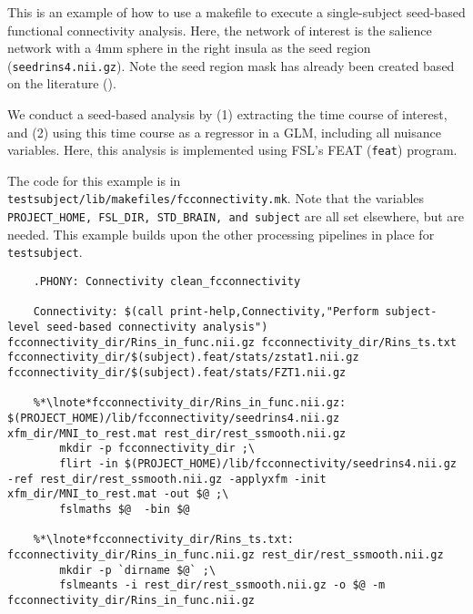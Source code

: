 \label{example:fcconnectivity}
This is an example of how to use a makefile to execute a
single-subject seed-based functional connectivity analysis. Here, the network of interest is the salience network with a 4mm sphere in the right insula as the seed region (\texttt{seedrins4.nii.gz}). Note the seed region mask has already been created based on the literature (\cite{seely2008,lee2014}).

We conduct a seed-based analysis by (1) extracting the time course of
interest, and (2) using this time course as a regressor in a GLM,
including all nuisance variables. Here, this analysis is implemented
using FSL's FEAT (\texttt{feat}) program.


The code for this example is in \texttt{testsubject/lib/makefiles/fcconnectivity.mk}.
Note that the variables \texttt{PROJECT_HOME, FSL_DIR, STD_BRAIN, and subject} are all set elsewhere, but are needed.  This example builds upon the other processing pipelines in place for \texttt{testsubject}.

\begin{lstlisting}
	.PHONY: Connectivity clean_fcconnectivity

	Connectivity: $(call print-help,Connectivity,"Perform subject-level seed-based connectivity analysis") fcconnectivity_dir/Rins_in_func.nii.gz fcconnectivity_dir/Rins_ts.txt fcconnectivity_dir/$(subject).feat/stats/zstat1.nii.gz fcconnectivity_dir/$(subject).feat/stats/FZT1.nii.gz

	%*\lnote*fcconnectivity_dir/Rins_in_func.nii.gz: $(PROJECT_HOME)/lib/fcconnectivity/seedrins4.nii.gz xfm_dir/MNI_to_rest.mat rest_dir/rest_ssmooth.nii.gz
		mkdir -p fcconnectivity_dir ;\
		flirt -in $(PROJECT_HOME)/lib/fcconnectivity/seedrins4.nii.gz -ref rest_dir/rest_ssmooth.nii.gz -applyxfm -init xfm_dir/MNI_to_rest.mat -out $@ ;\
		fslmaths $@  -bin $@ 
	
	%*\lnote*fcconnectivity_dir/Rins_ts.txt: fcconnectivity_dir/Rins_in_func.nii.gz rest_dir/rest_ssmooth.nii.gz
		mkdir -p `dirname $@` ;\
		fslmeants -i rest_dir/rest_ssmooth.nii.gz -o $@ -m fcconnectivity_dir/Rins_in_func.nii.gz

\end{lstlisting}

